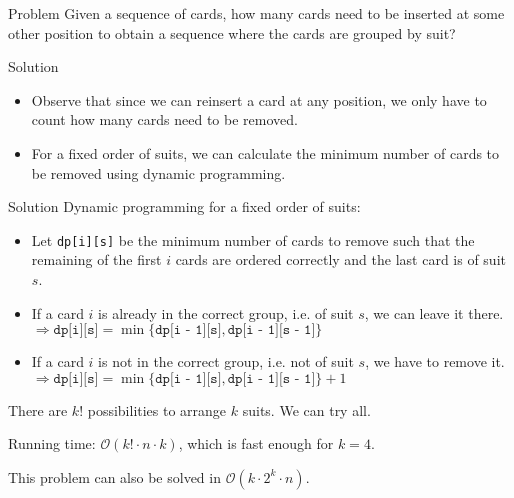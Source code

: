 \begin{slide}
	\begin{block}{Problem}
		Given a sequence of cards, how many cards need to be inserted at some other position to obtain a sequence where the cards are grouped by suit?
	\end{block}
	\pause


	\begin{block}{Solution}
		\begin{itemize}
			\item Observe that since we can reinsert a card at any position, we only have to count how many cards need to be removed. \pause
			\item For a fixed order of suits, we can calculate the minimum number of cards to be removed using dynamic programming.
		\end{itemize}
	\end{block}
\end{slide}

\begin{slide}
	\begin{block}{Solution}
		Dynamic programming for a fixed order of suits:
		\begin{itemize}
			\item Let \texttt{dp[i][s]} be the minimum number of cards to remove such that the remaining of the first $i$ cards are ordered correctly and the last card is of suit $s$. \pause
			\item If a card $i$ is already in the correct group, i.e. of suit $s$, we can leave it there. \\
			$\Rightarrow \texttt{dp[i][s]} = \min\{\texttt{dp[i - 1][s]}, \texttt{dp[i - 1][s - 1]}\}$ \pause
			\item If a card $i$ is not in the correct group, i.e. not of suit $s$, we have to remove it.
			$\Rightarrow \texttt{dp[i][s]} = \min\{\texttt{dp[i - 1][s]}, \texttt{dp[i - 1][s - 1]}\}+1$
		\end{itemize}

		\smallskip
		\pause
		There are $k!$ possibilities to arrange $k$ suits. We can try all.

		\pause
		\smallskip
		Running time: $\mathcal{O}(k! \cdot n \cdot k)$, which is fast enough for $k = 4$.

		\pause
		\smallskip
		This problem can also be solved in $\mathcal{O}(k \cdot 2^k \cdot n)$.
	\end{block}
\end{slide}

